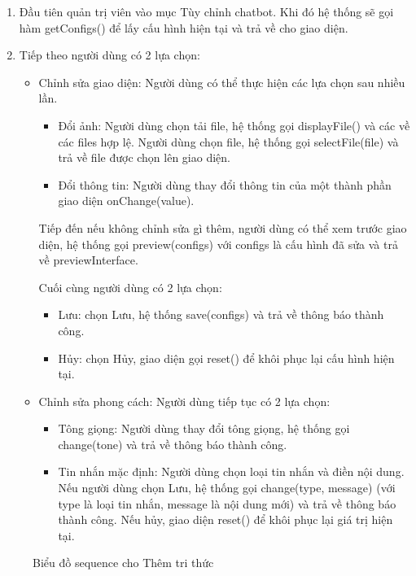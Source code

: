 \begin{enumerate}
	\item Đầu tiên quản trị viên vào mục Tùy chỉnh chatbot. Khi đó hệ thống sẽ gọi hàm getConfigs() để lấy cấu hình hiện tại và trả về cho giao diện. 
	\item Tiếp theo người dùng có 2 lựa chọn:
	\begin{itemize}
		\item Chỉnh sửa giao diện: Người dùng có thể thực hiện các lựa chọn sau nhiều lần.
		\begin{itemize}
			\item Đổi ảnh: Người dùng chọn tải file, hệ thống gọi displayFile() và các về các files hợp lệ. Người dùng chọn file, hệ thống gọi selectFile(file) và trả về file được chọn lên giao diện.
			\item Đổi thông tin: Người dùng thay đổi thông tin của một thành phần giao diện onChange(value).
		\end{itemize}
		Tiếp đến nếu không chỉnh sửa gì thêm, người dùng có thể xem trước giao diện, hệ thống gọi preview(configs) với configs là cấu hình đã sửa và trả về previewInterface.

		Cuối cùng người dùng có 2 lựa chọn:
		\begin{itemize}
			\item Lưu: chọn Lưu, hệ thống save(configs) và trả về thông báo thành công.
			\item Hủy: chọn Hủy, giao diện gọi reset() để khôi phục lại cấu hình hiện tại.
		\end{itemize}
		\item Chỉnh sửa phong cách: Người dùng tiếp tục có 2 lựa chọn:
		\begin{itemize}
			\item Tông giọng: Người dùng thay đổi tông giọng, hệ thống gọi change(tone) và trả về thông báo thành công.
			\item Tin nhắn mặc định: Người dùng chọn loại tin nhắn và điền nội dung. Nếu người dùng chọn Lưu, hệ thống gọi change(type, message) (với type là loại tin nhắn, message là nội dung mới) và trả về thông báo thành công. Nếu hủy, giao diện reset() để khôi phục lại giá trị hiện tại.
		\end{itemize}
	\end{itemize}
\end{enumerate}

\begin{figure}[H]
	\centering
	
	\vspace{0.5cm}
	\caption{Biểu đồ sequence cho Thêm tri thức}
	\label{fig:enter-label}
\end{figure}



